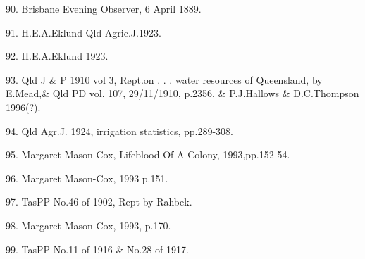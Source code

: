 90. Brisbane Evening Observer, 6 April 1889. 

91. H.E.A.Eklund Qld Agric.J.1923. 

92. H.E.A.Eklund 1923.

93. Qld J \& P 1910 vol 3, Rept.on . . . water resources of Queensland,
      by E.Mead,\& Qld PD vol. 107, 29/11/1910, p.2356, \& P.J.Hallows \& 
      D.C.Thompson 1996(?).

94. Qld Agr.J. 1924, irrigation statistics, pp.289-308.

95. Margaret Mason-Cox, Lifeblood Of A Colony, 1993,pp.152-54.

96. Margaret Mason-Cox, 1993 p.151. 

97. TasPP No.46 of 1902, Rept by Rahbek.

98. Margaret Mason-Cox, 1993, p.170.

99. TasPP No.11 of 1916 \& No.28 of 1917.
